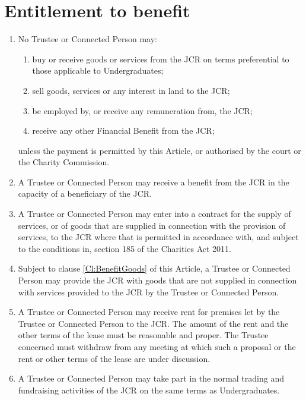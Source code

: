 \documentclass[11pt,a4paper, oneside]{memoir}
\begin{document}
	\section{Entitlement to benefit} \label{Art:TrusteeBenefit}
	\begin{enumerate}
		\item No Trustee or Connected Person may:
		\begin{enumerate}
			\item buy or receive goods or services from the JCR on terms preferential to those applicable to Undergraduates;
			\item sell goods, services or any interest in land to the JCR;
			\item be employed by, or receive any remuneration from, the JCR;
			\item receive any other Financial Benefit from the JCR;
		\end{enumerate}
		unless the payment is permitted by this Article, or authorised by the court or the Charity Commission.
		\item \label{Cl:BeneficiaryBenefit} A Trustee or Connected Person may receive a benefit from the JCR in the capacity of a beneficiary of the JCR.
		\item A Trustee or Connected Person may enter into a contract for the supply of services, or of goods that are supplied in connection with the provision of services, to the JCR where that is permitted in accordance with, and subject to the conditions in, section 185 of the Charities Act 2011.
		\item \label{Cl:BenefitGoods0} Subject to clause \ref{Cl:BenefitGoods} of this Article, a Trustee or Connected Person may provide the JCR with goods that are not supplied in connection with services provided to the JCR by the Trustee or Connected Person.
		\item A Trustee or Connected Person may receive rent for premises let by the Trustee or Connected Person to the JCR. The amount of the rent and the other terms of the lease must be reasonable and proper. The Trustee concerned must withdraw from any meeting at which such a proposal or the rent or other terms of the lease are under discussion.
		\item A Trustee or Connected Person may take part in the normal trading and fundraising activities of the JCR on the same terms as Undergraduates.

\end{enumerate}
\end{document}
